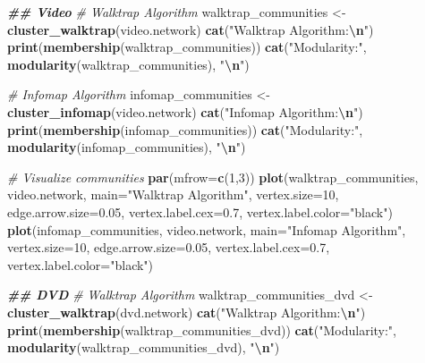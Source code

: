 \documentclass[
]{article}
\newenvironment{Shaded}{\begin{snugshade}}{\end{snugshade}}
\newcommand{\AttributeTok}[1]{\textcolor[rgb]{0.13,0.29,0.53}{#1}}
\newcommand{\CommentTok}[1]{\textcolor[rgb]{0.56,0.35,0.01}{\textit{#1}}}
\newcommand{\DecValTok}[1]{\textcolor[rgb]{0.00,0.00,0.81}{#1}}
\newcommand{\DocumentationTok}[1]{\textcolor[rgb]{0.56,0.35,0.01}{\textbf{\textit{#1}}}}
\newcommand{\FloatTok}[1]{\textcolor[rgb]{0.00,0.00,0.81}{#1}}
\newcommand{\FunctionTok}[1]{\textcolor[rgb]{0.13,0.29,0.53}{\textbf{#1}}}
\newcommand{\NormalTok}[1]{#1}
\newcommand{\OtherTok}[1]{\textcolor[rgb]{0.56,0.35,0.01}{#1}}
\newcommand{\SpecialCharTok}[1]{\textcolor[rgb]{0.81,0.36,0.00}{\textbf{#1}}}
\newcommand{\StringTok}[1]{\textcolor[rgb]{0.31,0.60,0.02}{#1}}
\begin{document}
\begin{Shaded}
\begin{Highlighting}[]
\DocumentationTok{\#\# Video}
\CommentTok{\# Walktrap Algorithm}
\NormalTok{walktrap\_communities }\OtherTok{\textless{}{-}} \FunctionTok{cluster\_walktrap}\NormalTok{(video.network)}
\FunctionTok{cat}\NormalTok{(}\StringTok{"Walktrap Algorithm:}\SpecialCharTok{\textbackslash{}n}\StringTok{"}\NormalTok{)}
\FunctionTok{print}\NormalTok{(}\FunctionTok{membership}\NormalTok{(walktrap\_communities))}
\FunctionTok{cat}\NormalTok{(}\StringTok{"Modularity:"}\NormalTok{, }\FunctionTok{modularity}\NormalTok{(walktrap\_communities), }\StringTok{"}\SpecialCharTok{\textbackslash{}n}\StringTok{"}\NormalTok{)}

\CommentTok{\# Infomap Algorithm}
\NormalTok{infomap\_communities }\OtherTok{\textless{}{-}} \FunctionTok{cluster\_infomap}\NormalTok{(video.network)}
\FunctionTok{cat}\NormalTok{(}\StringTok{"Infomap Algorithm:}\SpecialCharTok{\textbackslash{}n}\StringTok{"}\NormalTok{)}
\FunctionTok{print}\NormalTok{(}\FunctionTok{membership}\NormalTok{(infomap\_communities))}
\FunctionTok{cat}\NormalTok{(}\StringTok{"Modularity:"}\NormalTok{, }\FunctionTok{modularity}\NormalTok{(infomap\_communities), }\StringTok{"}\SpecialCharTok{\textbackslash{}n}\StringTok{"}\NormalTok{)}

\CommentTok{\# Visualize communities }
\FunctionTok{par}\NormalTok{(}\AttributeTok{mfrow=}\FunctionTok{c}\NormalTok{(}\DecValTok{1}\NormalTok{,}\DecValTok{3}\NormalTok{))}
\FunctionTok{plot}\NormalTok{(walktrap\_communities, video.network, }\AttributeTok{main=}\StringTok{"Walktrap Algorithm"}\NormalTok{, }\AttributeTok{vertex.size=}\DecValTok{10}\NormalTok{, }\AttributeTok{edge.arrow.size=}\FloatTok{0.05}\NormalTok{, }\AttributeTok{vertex.label.cex=}\FloatTok{0.7}\NormalTok{, }\AttributeTok{vertex.label.color=}\StringTok{"black"}\NormalTok{)}
\FunctionTok{plot}\NormalTok{(infomap\_communities, video.network, }\AttributeTok{main=}\StringTok{"Infomap Algorithm"}\NormalTok{, }\AttributeTok{vertex.size=}\DecValTok{10}\NormalTok{, }\AttributeTok{edge.arrow.size=}\FloatTok{0.05}\NormalTok{, }\AttributeTok{vertex.label.cex=}\FloatTok{0.7}\NormalTok{, }\AttributeTok{vertex.label.color=}\StringTok{"black"}\NormalTok{)}

\DocumentationTok{\#\# DVD}
\CommentTok{\# Walktrap Algorithm}
\NormalTok{walktrap\_communities\_dvd }\OtherTok{\textless{}{-}} \FunctionTok{cluster\_walktrap}\NormalTok{(dvd.network)}
\FunctionTok{cat}\NormalTok{(}\StringTok{"Walktrap Algorithm:}\SpecialCharTok{\textbackslash{}n}\StringTok{"}\NormalTok{)}
\FunctionTok{print}\NormalTok{(}\FunctionTok{membership}\NormalTok{(walktrap\_communities\_dvd))}
\FunctionTok{cat}\NormalTok{(}\StringTok{"Modularity:"}\NormalTok{, }\FunctionTok{modularity}\NormalTok{(walktrap\_communities\_dvd), }\StringTok{"}\SpecialCharTok{\textbackslash{}n}\StringTok{"}\NormalTok{)}


\end{Highlighting}
\end{Shaded}
\end{document}
